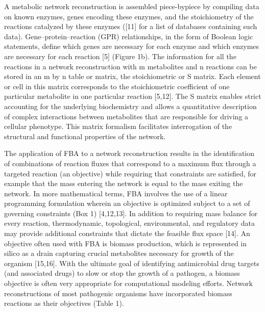 A metabolic network reconstruction is assembled piece-bypiece 
by compiling data on known enzymes, genes encoding these enzymes, 
and the stoichiometry of the reactions catalyzed by these enzymes 
([11] for a list of databases containing such data). Gene–protein–reaction 
(GPR) relationships, in the form of Boolean logic statements, define 
which genes are necessary for each enzyme and which enzymes are 
necessary for each reaction [5] (Figure 1b). The information for 
all the reactions in a network reconstruction with m metabolites 
and n reactions can be stored in an m by n table or matrix, the 
stoichiometric or S matrix. Each element or cell in this matrix 
corresponds to the stoichiometric coefficient of one particular 
metabolite in one particular reaction [5,12]. The S matrix enables 
strict accounting for the underlying biochemistry and allows a 
quantitative description of complex interactions between metabolites 
that are responsible for driving a cellular phenotype. This matrix 
formalism facilitates interrogation of the structural and functional 
properties of the network.

The application of FBA to a network reconstruction results in the 
identification of combinations of reaction fluxes that correspond 
to a maximum flux through a targeted reaction (an objective) while 
requiring that constraints are satisfied, for example that the 
mass entering the network is equal to the mass exiting the network. 
In more mathematical terms, FBA involves the use of a linear 
programming formulation wherein an objective is optimized subject 
to a set of governing constraints (Box 1) [4,12,13]. In addition 
to requiring mass balance for every reaction, thermodynamic, 
topological, environmental, and regulatory data may provide 
additional constraints that dictate the feasible flux space [14]. 
An objective often used with FBA is biomass production, which is 
represented in silico as a drain capturing crucial metabolites 
necessary for growth of the organism [15,16]. With the ultimate 
goal of identifying antimicrobial drug targets (and associated 
drugs) to slow or stop the growth of a pathogen, a biomass objective 
is often very appropriate for computational modeling efforts. 
Network reconstructions of most pathogenic organisms have incorporated 
biomass reactions as their objectives (Table 1).

